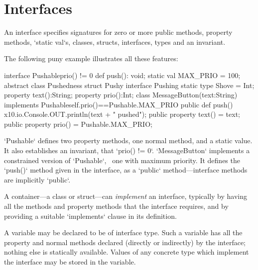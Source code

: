 \chapter{Interfaces}
\label{XtenInterfaces}

An interface specifies signatures for zero or more public methods, property
methods,
\xcd`static val`s, 
classes, structs, interfaces, types
and an invariant. 

The following puny example illustrates all these features: 
% 
\begin{xten}
interface Pushable{prio() != 0} {
  def push(): void;
  static val MAX_PRIO = 100;
  abstract class Pushedness{}
  struct Pushy{}
  interface Pushing{}
  static type Shove = Int;
  property text():String;
  property prio():Int;
}
class MessageButton(text:String)
  implements Pushable{self.prio()==Pushable.MAX_PRIO} {
  public def push() { 
    x10.io.Console.OUT.println(text + " pushed");
  }
  public property text() = text;
  public property prio() = Pushable.MAX_PRIO;
}
\end{xten}
%
\noindent
\xcd`Pushable` defines two property methods, one normal method, and a static
value.  It also 
establishes an invariant, that \xcd`prio() != 0`. 
\xcd`MessageButton` implements a constrained version of \xcd`Pushable`,
\viz\ one with maximum priority.  It
defines the \xcd`push()` method given in the interface, as a \xcd`public`
method---interface methods are implicitly \xcd`public`.


A container---a class or struct---can {\em implement} an interface,
typically by having all the methods and property methods that the interface
requires, and by providing a suitable \xcd`implements` clause in its definition.

A variable may be declared to be of interface type.  Such a variable has all
the property and normal methods declared (directly or indirectly) by the
interface; 
nothing else is statically available.  Values of any concrete type which
implement the interface may be stored in the variable.  

